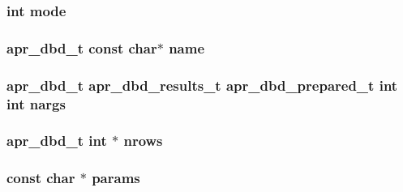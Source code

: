 \subsubsection[{\texorpdfstring{mode}{mode}}]{ {\bf int} mode}\hypertarget{group__APR__Util__DBD_ga609c0b243f5f71fe3f8c89844f390461}{}\label{group__APR__Util__DBD_ga609c0b243f5f71fe3f8c89844f390461}
\subsubsection[{\texorpdfstring{name}{name}}]{ {\bf apr\+\_\+dbd\+\_\+t} const char$\ast$ name}\hypertarget{group__APR__Util__DBD_ga775c8abc6814430216f2c583b8beaece}{}\label{group__APR__Util__DBD_ga775c8abc6814430216f2c583b8beaece}
\subsubsection[{\texorpdfstring{nargs}{nargs}}]{ {\bf apr\+\_\+dbd\+\_\+t} {\bf apr\+\_\+dbd\+\_\+results\+\_\+t} {\bf apr\+\_\+dbd\+\_\+prepared\+\_\+t} {\bf int} {\bf int} nargs}\hypertarget{group__APR__Util__DBD_ga7b9eedb8b5923d616c292903065439f6}{}\label{group__APR__Util__DBD_ga7b9eedb8b5923d616c292903065439f6}
\subsubsection[{\texorpdfstring{nrows}{nrows}}]{ {\bf apr\+\_\+dbd\+\_\+t} {\bf int} $\ast$ nrows}\hypertarget{group__APR__Util__DBD_gab2b92eb3b022a090ef84c159253fb635}{}\label{group__APR__Util__DBD_gab2b92eb3b022a090ef84c159253fb635}
\subsubsection[{\texorpdfstring{params}{params}}]{ const char $\ast$ params}\hypertarget{group__APR__Util__DBD_ga9a8bda9fdcb1d8f1784e4eef621a0ae2}{}\label{group__APR__Util__DBD_ga9a8bda9fdcb1d8f1784e4eef621a0ae2}
